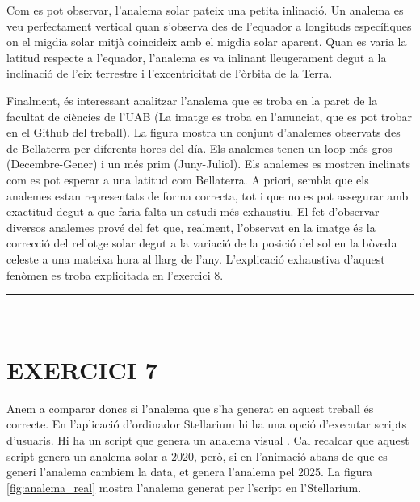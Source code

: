 \documentclass[a4paper, 11pt]{article}
\begin{document}
\noindent Com es pot observar, l'analema solar pateix una petita inlinació. Un analema es veu perfectament vertical quan s'observa des de l'equador a longituds específiques on el migdia solar mitjà coincideix amb el migdia solar aparent. Quan es varia la latitud respecte a l'equador, l'analema es va inlinant lleugerament degut a la inclinació de l'eix terrestre i l'excentricitat de l'òrbita de la Terra.

\vspace{2mm}

\noindent Finalment, és interessant analitzar l'analema que es troba en la paret de la facultat de ciències de l'UAB (La imatge es troba en l'anunciat, que es pot trobar en el Github del treball). La figura mostra un conjunt d'analemes observats des de Bellaterra per diferents hores del día. Els analemes tenen un loop més gros (Decembre-Gener) i un més prim (Juny-Juliol). Els analemes es mostren inclinats com es pot esperar a una latitud com Bellaterra. A priori, sembla que els analemes estan representats de forma correcta, tot i que no es pot assegurar amb exactitud degut a que faria falta un estudi més exhaustiu. El fet d'observar diversos analemes prové del fet que, realment, l'observat en la imatge és la correcció del rellotge solar degut a la variació de la posició del sol en la bòveda celeste a una mateixa hora al llarg de l'any. L'explicació exhaustiva d'aquest fenòmen es troba explicitada en l'exercici 8.

\vspace{10mm}
\hrule\
\vspace{5mm}


\section*{EXERCICI 7}

\noindent Anem a comparar doncs si l'analema que s'ha generat en aquest treball és correcte. En l'aplicació d'ordinador Stellarium hi ha una opció d'executar scripts d'usuaris. Hi ha un script que genera un analema visual \cite{SCRIPT_STELLARIUM}. Cal recalcar que aquest script genera un analema solar a 2020, però, si en l'animació abans de que es generi l'analema cambiem la data, et genera l'analema pel 2025. La figura \ref{fig:analema_real} mostra l'analema generat per l'script en l'Stellarium.
\end{document}
